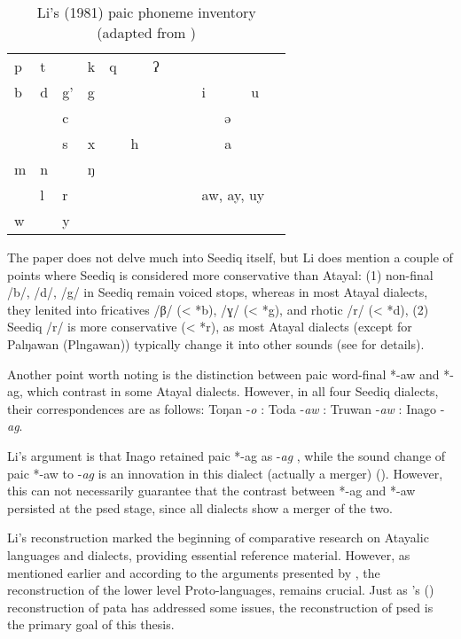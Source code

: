 \begingroup
{}
\renewcommand\arraystretch{1.5}
\begin{table}[H]
\centering
\caption{Li's (1981) \acl{paic} phoneme inventory (adapted from \cite[272]{li1981paic})}
\label{tab:lipaic}
\begin{tabular}{lllllllllllll}
\hline
p & t &    & k & q &   & ʔ &  &  &          &          &          &  \\
b & d & g' & g &   &   &   &  &  & i        &          & u        &  \\
  &   & c  &   &   &   &   &  &  &          & ə        &          &  \\
  &   & s  & x &   & h &   &  &  &          & a        &          &  \\
m & n &    & ŋ &   &   &   &  &  &          &          &          &  \\
  & l & r  &   &   &   &   &  &  & \multicolumn{3}{l}{aw, ay, uy} &  \\
w &   & y  &   &   &   &   &  &  &          &          &          &  \\ \hline
\end{tabular}
\end{table}
\endgroup

The paper does not delve much into Seediq itself, but Li does mention a couple of points where Seediq is considered more conservative than Atayal: (1) non-final /b/, /d/, /g/ in Seediq remain voiced stops, whereas in most Atayal dialects, they lenited into fricatives /β/ (< *b), /ɣ/ (< *g), and rhotic /r/ (< *d), (2) Seediq /r/ is more conservative (< *r), as most Atayal dialects (except for Palŋawan (Plngawan)) typically change it into other sounds (see \cite[264--265]{li1981paic} for details).

Another point worth noting is the distinction between \acl{paic} word-final *-aw and *-ag, which contrast in some Atayal dialects. However, in all four Seediq dialects, their correspondences are as follows: Toŋan -\textit{o} : Toda -\textit{aw} : Truwan -\textit{aw} : Inago -\textit{ag}.

Li's argument is that Inago retained \ac{paic} *-ag as -\textit{ag} , while the sound change of \ac{paic} *-aw to -\textit{ag} is an innovation in this dialect (actually a merger) (\cite[257--258,271]{li1981paic}). However, this can not necessarily guarantee that the contrast between *-ag and *-aw persisted at the \acl{psed} stage, since all dialects show a merger of the two.

Li's reconstruction marked the beginning of comparative research on Atayalic languages and dialects, providing essential reference material. However, as mentioned earlier and according to the arguments presented by \textcite{song2022Aicd,song2023Aicgprime}, the reconstruction of the lower level Proto-languages, remains crucial. Just as \citeauthor{goderich2020phd}'s (\citeyear{goderich2020phd}) reconstruction of \acl{pata} has addressed some issues, the reconstruction of \acl{psed} is the primary goal of this thesis.

